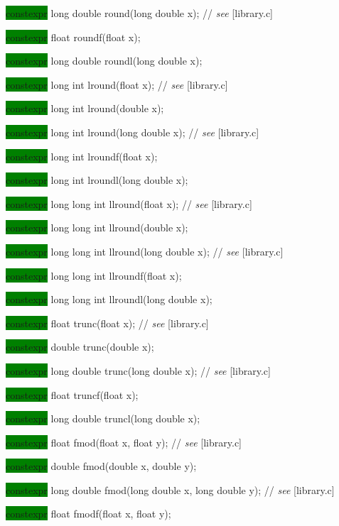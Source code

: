 \documentclass[prd,twocolumn,amsmath,amssymb,nofootinbib,eqsecnum]{revtex4-1}
\newcommand{\highlight}[1]{\colorbox{green}{\!\!\!\! #1}}
\newcommand{\stdcomment}[1]{{// {\it see} [#1]}}
\begin{document}
{\highlight{constexpr} long double round(long double x); \stdcomment{library.c}

\highlight{constexpr} float roundf(float x);

\highlight{constexpr} long double roundl(long double x);

\vspace{2ex}

\highlight{constexpr} long int lround(float x); \stdcomment{library.c}

\highlight{constexpr} long int lround(double x);

\highlight{constexpr} long int lround(long double x); \stdcomment{library.c}

\highlight{constexpr} long int lroundf(float x);

\highlight{constexpr} long int lroundl(long double x);

\vspace{2ex}

\highlight{constexpr} long long int llround(float x); \stdcomment{library.c}

\highlight{constexpr} long long int llround(double x);

\highlight{constexpr} long long int llround(long double x); \stdcomment{library.c}

\highlight{constexpr} long long int llroundf(float x);

\highlight{constexpr} long long int llroundl(long double x);

\vspace{2ex}

\highlight{constexpr} float trunc(float x); \stdcomment{library.c}

\highlight{constexpr} double trunc(double x);

\highlight{constexpr} long double trunc(long double x); \stdcomment{library.c}

\highlight{constexpr} float truncf(float x);

\highlight{constexpr} long double truncl(long double x);

\vspace{2ex}

\highlight{constexpr} float fmod(float x, float y); \stdcomment{library.c}

\highlight{constexpr} double fmod(double x, double y);

\highlight{constexpr} long double fmod(long double x, long double y); \stdcomment{library.c}

\highlight{constexpr} float fmodf(float x, float y);

}
\end{document}
